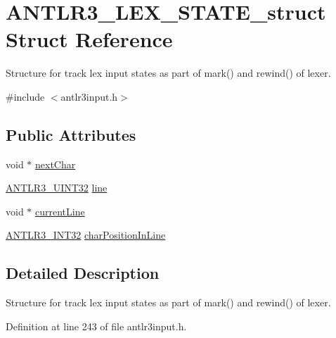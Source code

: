 \hypertarget{struct_a_n_t_l_r3___l_e_x___s_t_a_t_e__struct}{\section{A\-N\-T\-L\-R3\-\_\-\-L\-E\-X\-\_\-\-S\-T\-A\-T\-E\-\_\-struct Struct Reference}
\label{struct_a_n_t_l_r3___l_e_x___s_t_a_t_e__struct}
}


Structure for track lex input states as part of mark() and rewind() of lexer.  




{\ttfamily \#include $<$antlr3input.\-h$>$}

\subsection*{Public Attributes}
\begin{DoxyCompactItemize}
\item 
void $\ast$ \hyperlink{struct_a_n_t_l_r3___l_e_x___s_t_a_t_e__struct_ac1a199a9d03827b5a0f4903c471a8823}{next\-Char}
\item 
\hyperlink{antlr3defs_8h_ac41f744abd0fd25144b9eb9d11b1dfd1}{A\-N\-T\-L\-R3\-\_\-\-U\-I\-N\-T32} \hyperlink{struct_a_n_t_l_r3___l_e_x___s_t_a_t_e__struct_a00999851e4d46ac4cd60e3be5c0bac13}{line}
\item 
void $\ast$ \hyperlink{struct_a_n_t_l_r3___l_e_x___s_t_a_t_e__struct_a02f3890c40ac5408967b59943261c90c}{current\-Line}
\item 
\hyperlink{antlr3defs_8h_a6faef5c4687f8eb633d2aefea93973ca}{A\-N\-T\-L\-R3\-\_\-\-I\-N\-T32} \hyperlink{struct_a_n_t_l_r3___l_e_x___s_t_a_t_e__struct_a73739086ab0955aa12c5e9d1242df682}{char\-Position\-In\-Line}
\end{DoxyCompactItemize}


\subsection{Detailed Description}
Structure for track lex input states as part of mark() and rewind() of lexer. 

Definition at line 243 of file antlr3input.\-h.



